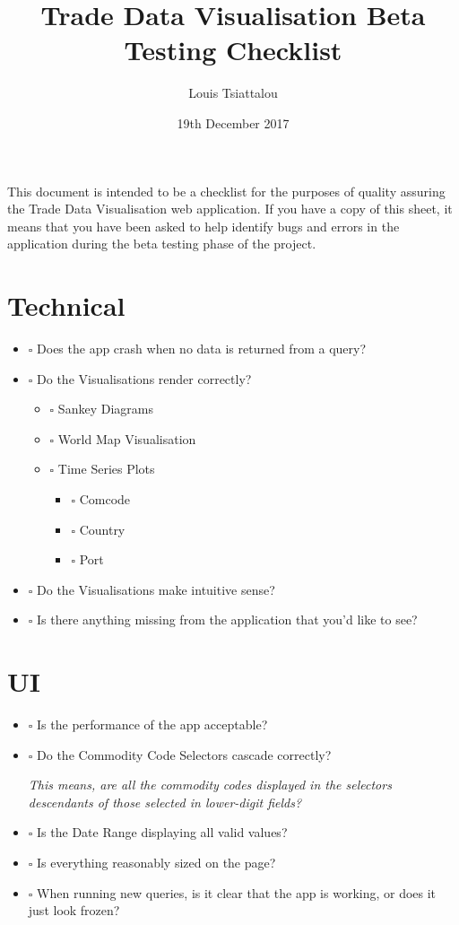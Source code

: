\documentclass[11pt]{article}
\author{Louis Tsiattalou}
\date{19th December 2017}
\title{Trade Data Visualisation Beta Testing Checklist}
\begin{document}
\maketitle
This document is intended to be a checklist for the purposes of quality assuring the Trade Data Visualisation web application. If you have a copy of this sheet, it means that you have been asked to help identify bugs and errors in the application during the beta testing phase of the project.

\section{Technical}
\label{sec-1}
\begin{itemize}
\item $\square$ Does the app crash when no data is returned from a query?
\item $\square$ Do the Visualisations render correctly?
\begin{itemize}
\item $\square$ Sankey Diagrams
\item $\square$ World Map Visualisation
\item $\square$ Time Series Plots
\begin{itemize}
\item $\square$ Comcode
\item $\square$ Country
\item $\square$ Port
\end{itemize}
\end{itemize}
\item $\square$ Do the Visualisations make intuitive sense?
\item $\square$ Is there anything missing from the application that you'd like to see?
\end{itemize}

\vspace*{6cm}

\section{UI}
\label{sec-2}
\begin{itemize}
\item $\square$ Is the performance of the app acceptable?
\item $\square$ Do the Commodity Code Selectors cascade correctly?

\emph{This means, are all the commodity codes displayed in the selectors descendants of those selected in lower-digit fields?}

\item $\square$ Is the Date Range displaying all valid values?
\item $\square$ Is everything reasonably sized on the page?
\item $\square$ When running new queries, is it clear that the app is working, or does it just look frozen?
\end{itemize}
\end{document}
